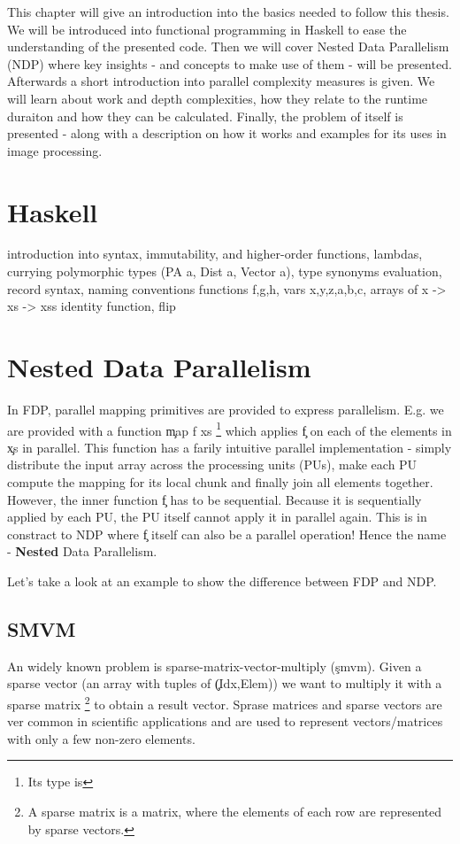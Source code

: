 

This chapter will give an introduction into the basics needed to
follow this thesis. We will be introduced into functional programming
in Haskell to ease the understanding of the presented code.
Then we will cover Nested Data Parallelism (NDP) where
key insights - and concepts to make use of them - will be presented.
Afterwards a short introduction into parallel complexity measures is given.
We will learn about work and depth complexities, how they relate
to the runtime duraiton and how they can be calculated.
Finally, the problem of \algo itself is presented - along with
a description on how it works and examples for its uses in image processing.

\section{Haskell}
  introduction into syntax, immutability, and higher-order functions, lambdas, currying
  polymorphic types (PA a, Dist a, Vector a), type synonyms
  evaluation, record syntax, naming conventions functions f,g,h, vars x,y,z,a,b,c, arrays of x -> xs -> xss
  identity function, flip

\section{Nested Data Parallelism}  
  In FDP, parallel mapping primitives are provided to express parallelism.
  E.g. we are provided with a function \c{map f xs}
  \footnote{Its type is }
  which applies \c{f} on each of the elements in \c{xs} in parallel.
  This function has a farily intuitive parallel implementation -
  simply distribute the input array across the processing units (PUs),
  make each PU compute the mapping for its local chunk and finally
  join all elements together.
  However, the inner function \c{f} has to be sequential.
  Because it is sequentially applied by each PU, the PU itself cannot
  apply it in parallel again.
  This is in constract to NDP where \c{f} itself can also be a parallel operation!
  Hence the name - \textbf{Nested} Data Parallelism.
  
  Let's take a look at an example to show the difference between FDP and NDP.
  
  \subsection{SMVM}
    An widely known problem is sparse-matrix-vector-multiply (\c{smvm}).
    Given a sparse vector (an array with tuples of \c{(Idx,Elem)}) we want
    to multiply it with a sparse matrix
    \footnote{A sparse matrix is a matrix,
    where the elements of each row are represented
    by sparse vectors.}
    to obtain a result vector.
    Sprase matrices and sparse vectors are ver common
    in scientific applications and are used to represent
    vectors/matrices with only a few non-zero elements.
    

